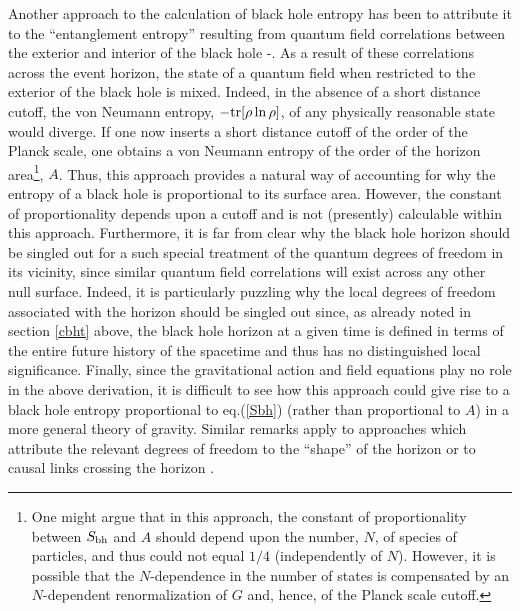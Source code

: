 \documentclass[12pt]{article}
\begin{document}
Another approach to the calculation of black hole entropy has been to
attribute it to the ``entanglement entropy'' resulting from quantum
field correlations between the exterior and interior of the black hole
\cite{bkls}-\cite{hlw}.  As a result of these correlations across the
event horizon, the state of a quantum field when restricted to the
exterior of the black hole is mixed. Indeed, in the absence of a short
distance cutoff, the von Neumann entropy, $- {\rm tr} [{\rho} \ln
{\rho}]$, of any physically reasonable state would diverge. If one now
inserts a short distance cutoff of the order of the Planck scale, one
obtains a von Neumann entropy of the order of the horizon
area\footnote{One might argue that in this approach, the constant of
proportionality between $S_{\rm bh}$ and $A$ should depend upon the
number, $N$, of species of particles, and thus could not equal $1/4$
(independently of $N$). However, it is possible that the
$N$-dependence in the number of states is compensated by an
$N$-dependent renormalization of $G$ \cite{su} and, hence, of the
Planck scale cutoff.}, $A$. Thus, this approach provides a natural way
of accounting for why the entropy of a black hole is proportional to
its surface area. However, the constant of proportionality depends
upon a cutoff and is not (presently) calculable within this
approach. Furthermore, it is far from clear why the black hole horizon
should be singled out for a such special treatment of the quantum
degrees of freedom in its vicinity, since similar quantum field
correlations will exist across any other null surface. Indeed, it is
particularly puzzling why the local degrees of freedom associated with
the horizon should be singled out since, as already noted in section
\ref{cbht} above, the black hole horizon at a given time is defined in
terms of the entire future history of the spacetime and thus has no
distinguished local significance. Finally, since the gravitational
action and field equations play no role in the above derivation, it is
difficult to see how this approach could give rise to a black hole
entropy proportional to eq.(\ref{Sbh}) (rather than proportional to
$A$) in a more general theory of gravity. Similar remarks apply to
approaches which attribute the relevant degrees of freedom to the
``shape'' of the horizon \cite{sork} or to causal links crossing the
horizon \cite{dou}.
\end{document}

